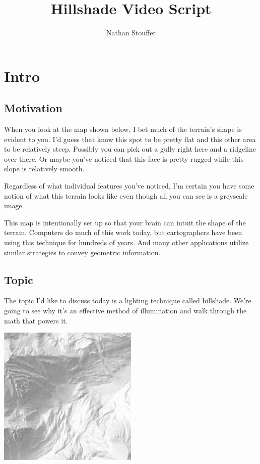 \documentclass{article}
\begin{document}
	
\title{Hillshade Video Script}
\author{Nathan Stouffer}
\date{}
\maketitle

\section{Intro}

\subsection{Motivation}

When you look at the map shown below, I bet much of the terrain's shape is evident to you.
I'd guess that know this spot to be pretty flat and this other area to be relatively steep.
Possibly you can pick out a gully right here and a ridgeline over there.
Or maybe you've noticed that this face is pretty rugged while this slope is relatively smooth.

Regardless of what individual features you've noticed, I'm certain you have some notion of what this terrain looks like even though all you can see is a greyscale image.

This map is intentionally set up so that your brain can intuit the shape of the terrain.
Computers do much of this work today, but cartographers have been using this technique for hundreds of years.
And many other applications utilize similar strategies to convey geometric information.

\subsection{Topic}

The topic I'd like to discuss today is a lighting technique called hillshade.
We're going to see why it's an effective method of illumination and walk through the math that powers it.

\begin{center}
	\includegraphics[width=0.5\textwidth,frame]{assets/hillshade-example.png}
\end{center}
\end{document}
